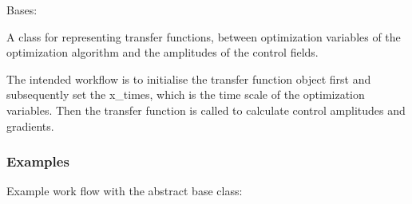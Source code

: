 \documentclass[letterpaper,10pt,english]{sphinxmanual}
\begin{document}

\begin{fulllineitems}
\label{\detokenize{qsim:qsim.transfer_function.TransferFunction}}
Bases: 

A class for representing transfer functions, between optimization
variables of the optimization algorithm and the amplitudes of the control
fields.

The intended workflow is to initialise the transfer function object first
and subsequently set the x\_times, which is the time scale of the
optimization variables. Then the transfer function is called to calculate
control amplitudes and gradients.
\subsubsection*{Examples}

Example work flow with the abstract base class:


\end{fulllineitems}
\end{document}
